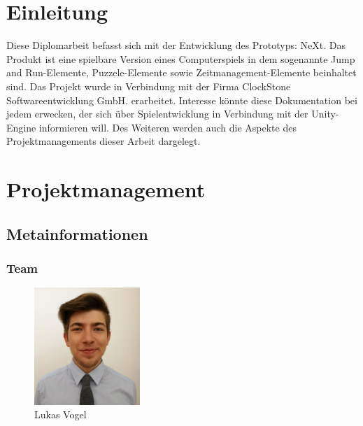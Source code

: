 

\def \currentAuthor {Lukas Vogel} %


\chapter{Einleitung}
Diese Diplomarbeit befasst sich mit der Entwicklung des Prototyps: NeXt. Das Produkt ist eine spielbare Version eines Computerspiels in dem sogenannte Jump and Run-Elemente, Puzzele-Elemente sowie Zeitmanagement-Elemente beinhaltet sind. Das Projekt wurde in Verbindung mit der Firma ClockStone Softwareentwicklung GmbH. erarbeitet. Interesse könnte diese Dokumentation bei jedem erwecken, der sich über Spielentwicklung in Verbindung mit der Unity-Engine informieren will. Des Weiteren werden auch die Aspekte des Projektmanagements dieser Arbeit dargelegt.

\chapter{Projektmanagement}

\section{Metainformationen}
\subsection{Team}

	\begin{figure}[H]
	\centering
		\includegraphics[width=4cm]{images/LukasVogel.png}
		\caption{Lukas Vogel}		
	\end{figure}

